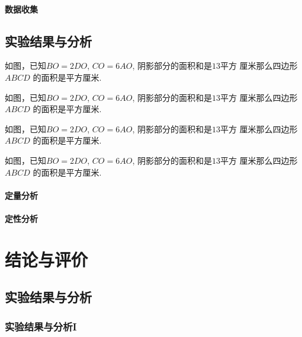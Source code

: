 \documentclass{USTBBook}
\begin{document}
\subsection{数据收集}
\zhlipsum[13]

\chapter{实验结果与分析}
\zhlipsum[14]


\begin{question*}
  如图，已知$BO=2DO$, $CO=6AO$, 阴影部分的面积和是$13$平方
  厘米那么四边形 $ABCD$ 的面积是\fillin[]平方厘米.
\end{question*}

\begin{question*}
  如图，已知$BO=2DO$, $CO=6AO$, 阴影部分的面积和是$13$平方
  厘米那么四边形 $ABCD$ 的面积是\fillin[]平方厘米.
\end{question*}

\begin{question*}
  如图，已知$BO=2DO$, $CO=6AO$, 阴影部分的面积和是$13$平方
  厘米那么四边形 $ABCD$ 的面积是\fillin[]平方厘米.
\end{question*}

\begin{question*}
  如图，已知$BO=2DO$, $CO=6AO$, 阴影部分的面积和是$13$平方
  厘米那么四边形 $ABCD$ 的面积是\fillin[]平方厘米.
\end{question*}

\subsection{定量分析}
\zhlipsum[16]

\subsection{定性分析}
\zhlipsum[17]

\part{结论与评价}
\ToggleSectionStyle
\ToggleQuestionStyle

\chapter{实验结果与分析}
\section{实验结果与分析I}
\zhlipsum[14]
\end{document}
